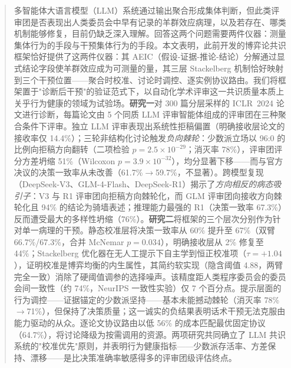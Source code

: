 \begin{abstract}
多智能体大语言模型（LLM）系统通过输出聚合形成集体判断，但此类评审团是否表现出人类委员会中早有记录的羊群效应病理，以及若存在、哪类机制能够修复，目前仍缺乏深入理解。回答这两个问题需要两件仪器：测量集体行为的手段与干预集体行为的手段。本文表明，此前开发的博弈论共识框架恰好提供了这两件仪器：其 AEIC（假设-证据-推论-结论）分解通过显式结论字段使羊群效应成为可测量的量，其三层 Stackelberg 机制恰好映射到三个干预位置——聚合时校准、讨论时调控、逐实例协议路由。我们将框架置于"诊断后干预"的验证范式下，以自动化学术评审这一共识质量本质上关乎行为健康的领域为试验场。\textbf{研究一}对 300 篇分层采样的 ICLR~2024 论文进行诊断，每篇论文由 5 个同质 LLM 评审智能体组成的评审团在三种聚合条件下评审。独立 LLM 评审表现出系统性拒稿偏置（明确接收层论文的接收率仅 14.4\%）；三轮非结构化讨论触发\emph{负向棘轮}：少数派立场以 96:0 的比例向拒稿方向翻转（二项检验 $p{=}2.5{\times}10^{-29}$；消灭率 78\%），评审团评分方差坍缩 51\%（Wilcoxon $p{=}3.9{\times}10^{-32}$），均分显著下移——而与官方决议的决策一致率从未改善（61.7\%$\to$59.7\%，不显著）。跨模型复现（DeepSeek-V3、GLM-4-Flash、DeepSeek-R1）揭示了\emph{方向相反的病态吸引子}：V3 与 R1 评审团向拒稿方向棘轮化，而 GLM 评审团向接收方向棘轮化且 94\% 的结论为骑墙表述；推理能力最强的 R1（决策一致率 67.3\%）反而遭受最大的多样性坍缩（76\%）。\textbf{研究二}将框架的三个层次分别作为针对单一病理的干预。静态校准层将决策一致率从 60\% 提升至 67\%（双臂 66.7\%/67.3\%，合并 McNemar $p{=}0.034$），明确接收层从 2\% 修复至 44\%；Stackelberg 优化器在无人工提示下自主学到恒正校准项（$\tau{=}+1.04$），证明校准是博弈均衡的内生属性，其简约软实现（隐含阈值 4.88，两臂完全一致）消除了硬阈值调参的选择噪声。该精度距人类程序委员会的委员会间一致性（约 74\%，NeurIPS 一致性实验）仅 7 个百分点。提示层面的行为调控——证据锚定的少数派坚持——基本未能撼动棘轮（消灭率 78\%$\to$71\%），但保持了决策质量；这一诚实的负结果表明话术干预无法克服由能力驱动的从众。逐论文协议路由以低 56\% 的成本匹配最优固定协议（64.7\%），将讨论降级为按需调用的资源。两项研究共同确立了 LLM 共识系统的"校准优先"原则，并表明行为健康指标——少数派存活率、方差保持、漂移——是比决策准确率敏感得多的评审团级评估终点。

\end{abstract}
